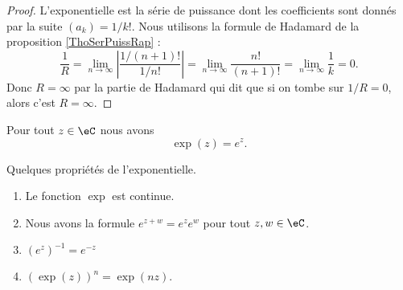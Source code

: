 \begin{proof}
	L'exponentielle est la série de puissance dont les coefficients sont donnés par la suite \( (a_k)=1/k!\). Nous utilisons la formule de Hadamard de la proposition \ref{ThoSerPuissRap} :
	\begin{equation}
		\frac{1}{ R }=\lim_{n\to \infty} \left| \frac{ 1/(n+1)! }{ 1/n! } \right| =\lim_{n\to \infty}\frac{ n! }{ (n+1)! }=\lim_{n\to\infty}\frac{ 1 }{ k }=0.
	\end{equation}
	Donc \( R=\infty\) par la partie de Hadamard qui dit que si on tombe sur \( 1/R=0\), alors c'est \( R=\infty\).
\end{proof}

\begin{proposition}     \label{PROPooWSDKooJREQGk}
	Pour tout \( z\in \eC\) nous avons
	\begin{equation}
		\exp(z)= e^{z}.
	\end{equation}
\end{proposition}

\begin{proposition}     \label{PropdDjisy}
	Quelques propriétés de l'exponentielle.
	\begin{enumerate}
		\item
		      Le fonction \( \exp\) est continue.
		\item       \label{ITEMooRLHCooJTuYKV}
		      Nous avons la formule \(  e^{z+w}= e^{z}e^w\) pour tout \( z,w\in \eC\).
		\item
		      \( (e^z)^{-1}= e^{-z}\)
		\item       \label{ITEMooIFYFooUniuKS}
		      \( (\exp(z))^n=\exp(nz)\).
	\end{enumerate}
\end{proposition}

